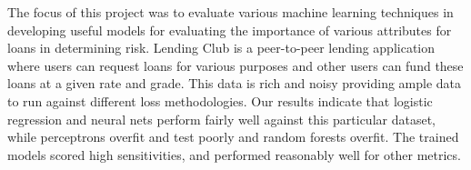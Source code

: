 The focus of this project was to evaluate various machine learning techniques in developing useful models for evaluating the importance of various attributes for loans in determining risk. 
Lending Club is a peer-to-peer lending application where users can request loans for various purposes and other users can fund these loans at a given rate and grade. This data is rich and noisy providing ample data to run against different loss methodologies. Our results indicate that logistic regression and neural nets perform fairly well against this particular dataset, while perceptrons overfit and test poorly and random forests overfit. The trained models scored high sensitivities, and performed reasonably well for other metrics.  